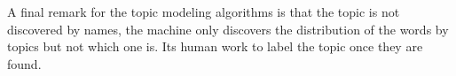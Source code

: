 	A final remark for the topic modeling algorithms is that the topic is not discovered by names, the machine only discovers the distribution of the words by topics but not which one is. Its human work to label the topic once they are found.
		 

%
%

	
	